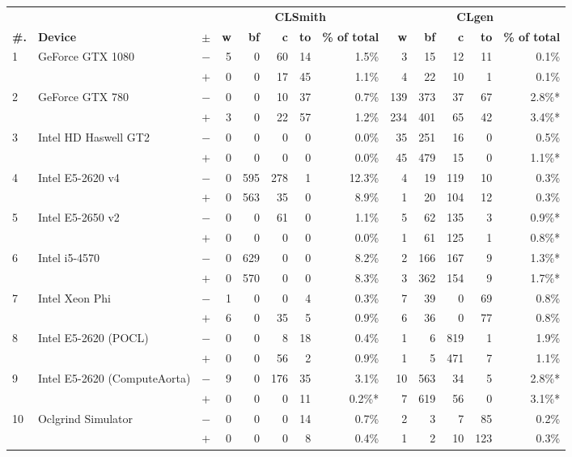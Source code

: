   \begin{tabular}{lll | rrrrr | rrrrr }
  \toprule
  & & & \multicolumn{5}{c|}{\textbf{CLSmith}} & \multicolumn{5}{c}{\textbf{CLgen}} \\
  \textbf{\#.} & \textbf{Device} & $\pm$ &
  \textbf{w} & \textbf{bf} & \textbf{c} & \textbf{to} & \textbf{\% of total} &
  \textbf{w} & \textbf{bf} & \textbf{c} & \textbf{to} & \textbf{\% of total} \\
  \midrule
  \multirow{ 2}{*}{1} & \multirow{ 2}{*}{GeForce GTX 1080} & $-$ & 5 & 0 & 60 & 14 & 1.5\%       & 3 & 15 & 12 & 11 & 0.1\% \\& & $+$ & 0 & 0 & 17 & 45 & 1.1\% & 4 & 22 & 10 & 1 & 0.1\% \\
\hline
\multirow{ 2}{*}{2} & \multirow{ 2}{*}{GeForce GTX 780} & $-$ & 0 & 0 & 10 & 37 & 0.7\%       & 139 & 373 & 37 & 67 & 2.8\%* \\& & $+$ & 3 & 0 & 22 & 57 & 1.2\% & 234 & 401 & 65 & 42 & 3.4\%* \\
\hline
\multirow{ 2}{*}{3} & \multirow{ 2}{*}{Intel HD Haswell GT2} & $-$ & 0 & 0 & 0 & 0 & 0.0\%       & 35 & 251 & 16 & 0 & 0.5\% \\& & $+$ & 0 & 0 & 0 & 0 & 0.0\% & 45 & 479 & 15 & 0 & 1.1\%* \\
\hline
\multirow{ 2}{*}{4} & \multirow{ 2}{*}{Intel E5-2620 v4} & $-$ & 0 & 595 & 278 & 1 & 12.3\%       & 4 & 19 & 119 & 10 & 0.3\% \\& & $+$ & 0 & 563 & 35 & 0 & 8.9\% & 1 & 20 & 104 & 12 & 0.3\% \\
\hline
\multirow{ 2}{*}{5} & \multirow{ 2}{*}{Intel E5-2650 v2} & $-$ & 0 & 0 & 61 & 0 & 1.1\%       & 5 & 62 & 135 & 3 & 0.9\%* \\& & $+$ & 0 & 0 & 0 & 0 & 0.0\% & 1 & 61 & 125 & 1 & 0.8\%* \\
\hline
\multirow{ 2}{*}{6} & \multirow{ 2}{*}{Intel i5-4570} & $-$ & 0 & 629 & 0 & 0 & 8.2\%       & 2 & 166 & 167 & 9 & 1.3\%* \\& & $+$ & 0 & 570 & 0 & 0 & 8.3\% & 3 & 362 & 154 & 9 & 1.7\%* \\
\hline
\multirow{ 2}{*}{7} & \multirow{ 2}{*}{Intel Xeon Phi} & $-$ & 1 & 0 & 0 & 4 & 0.3\%       & 7 & 39 & 0 & 69 & 0.8\% \\& & $+$ & 6 & 0 & 35 & 5 & 0.9\% & 6 & 36 & 0 & 77 & 0.8\% \\
\hline
\multirow{ 2}{*}{8} & \multirow{ 2}{*}{Intel E5-2620 (POCL)} & $-$ & 0 & 0 & 8 & 18 & 0.4\%       & 1 & 6 & 819 & 1 & 1.9\% \\& & $+$ & 0 & 0 & 56 & 2 & 0.9\% & 1 & 5 & 471 & 7 & 1.1\% \\
\hline
\multirow{ 2}{*}{9} & \multirow{ 2}{*}{Intel E5-2620 (ComputeAorta)} & $-$ & 9 & 0 & 176 & 35 & 3.1\%       & 10 & 563 & 34 & 5 & 2.8\%* \\& & $+$ & 0 & 0 & 0 & 11 & 0.2\%* & 7 & 619 & 56 & 0 & 3.1\%* \\
\hline
\multirow{ 2}{*}{10} & \multirow{ 2}{*}{Oclgrind Simulator} & $-$ & 0 & 0 & 0 & 14 & 0.7\%       & 2 & 3 & 7 & 85 & 0.2\% \\& & $+$ & 0 & 0 & 0 & 8 & 0.4\% & 1 & 2 & 10 & 123 & 0.3\% \\
  \bottomrule
\end{tabular}

